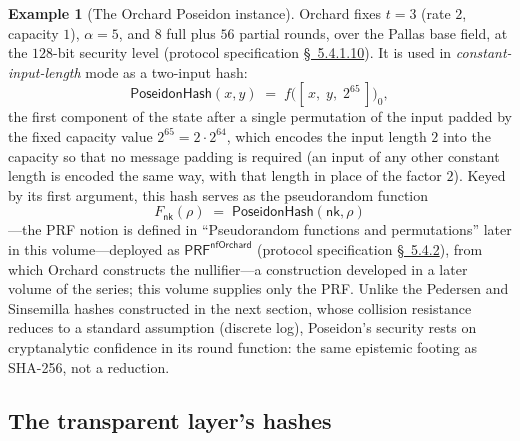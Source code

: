 \documentclass[11pt,a4paper]{article}
\theoremstyle{definition}
\newtheorem{example}[theorem]{Example}
\theoremstyle{remark}
\begin{document}
\begin{example}[The Orchard Poseidon instance]\label{hash:ex:orchard}
Orchard fixes \(t = 3\) (rate \(2\), capacity \(1\)),
\(\alpha = 5\), and \(8\) full plus \(56\) partial rounds, over the
Pallas base field, at the \(128\)-bit security level
(protocol specification \href{https://zips.z.cash/protocol/protocol.pdf\#poseidonhash}{\S~5.4.1.10}). It is used in
\emph{constant-input-length} mode as a two-input hash:
\[
\mathsf{PoseidonHash}(x, y) \;=\;
f\bigl([\,x,\; y,\; 2^{65}\,]\bigr)_{0},
\]
the first component of the state after a single permutation of the
input padded by the fixed capacity value
\(2^{65} = 2 \cdot 2^{64}\), which encodes the input length \(2\)
into the capacity so that no message padding is required
(an input of any other constant length is encoded the same way,
with that length in place of the factor \(2\)). Keyed by its first
argument, this hash serves as the pseudorandom function
\[
F_{\mathsf{nk}}(\rho) \;=\; \mathsf{PoseidonHash}(\mathsf{nk}, \rho)
\]
---the PRF notion is defined in ``Pseudorandom functions and
permutations'' later in this volume---deployed as
\(\mathsf{PRF}^{\mathsf{nfOrchard}}\) (protocol specification
\href{https://zips.z.cash/protocol/protocol.pdf\#concreteprfs}{\S~5.4.2}), from which Orchard constructs the
nullifier---a construction developed in a later volume of the series;
this volume supplies only the PRF. Unlike the Pedersen and Sinsemilla hashes
constructed in the next section, whose collision resistance reduces to
a standard assumption (discrete log), Poseidon's security rests on
cryptanalytic confidence in its round function: the same epistemic
footing as SHA-256, not a reduction.
\end{example}

\subsection{The transparent layer's hashes}
\label{hash:subsec:transparent}
\end{document}
